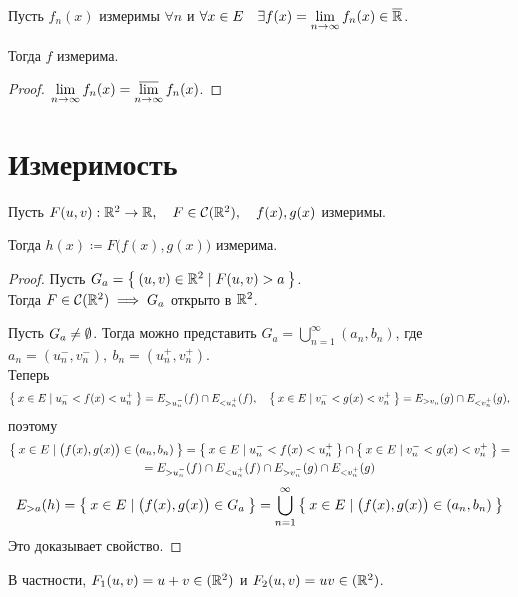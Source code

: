\begin{property}
	Пусть $ f_n(x) $ измеримы $ \forall n $ и $ \forall x \in E \quad \exists f(x) = \lim\limits_{n \to \infty} f_n(x) \in \overline {\mathbb{R}} $.

	Тогда $ f $ измерима.
\end{property}

\begin{proof}
	$ \lim\limits_{n \to \infty} f_n(x) = \varlimsup\limits_{n \to \infty} f_n(x) $.
\end{proof}

\section{Измеримость }

\begin{property}
	Пусть $ F(u, v) : \mathbb{R}^2 \to \mathbb{R}, \quad F \in \mathcal C(\mathbb{R}^2), \quad f(x), g(x) $ измеримы.

	Тогда $ h(x) \coloneq F \bigl( f(x), g(x) \bigr) $ измерима.
\end{property}

\begin{proof}

	Пусть $ G_a = \Set{(u, v) \in \ensuremath{\mathbb{R}}^2 \mid F(u, v) > a} $. \\
	Тогда $ F \in \mathcal C(\mathbb{R}^2) \implies G_a $ открыто в $ \mathbb{R}^2 $.

	Пусть $ G_a \ne \emptyset $. Тогда можно представить $ G_a = \bigcup_{n = 1}^\infty (a_n, b_n) $, где $ a_n = (u_n^-, v_n^-), ~ b_n = (u_n^+, v_n^+) $. \\
	Теперь
	$$ \Set{x \in E \mid u_n^- < f(x) < u_n^+} = E_{>u_n^-}(f) \cap E_{<u_n^+}(f), \quad \Set{x \in E \mid v_n^- < g(x) < v_n^+} = E_{>v_n}(g) \cap E_{<v_n^+}(g), $$
	поэтому
	\begin{multline*}
		\Set{x \in E \mid \bigl( f(x), g(x) \bigr) \in (a_n, b_n)} = \Set{x \in E \mid u_n^- < f(x) < u_n^+} \cap \Set{x \in E \mid v_n^- < g(x) < v_n^+} = \\
		= E_{>u_n^-}(f) \cap E_{<u_n^+}(f) \cap E_{>v_n^-}(g) \cap E_{<v_n^+}(g)
	\end{multline*}
	$$ E_{>a}(h) = \Set{x \in E \mid \bigl( f(x), g(x) \bigr) \in G_a} = \bigcup_{n = 1}^\infty \Set{x \in E \mid \bigl( f(x), g(x) \bigr) \in (a_n, b_n)} $$
	Это доказывает свойство.
\end{proof}

В частности, $ F_1(u, v) = u + v \in \mathcal(\mathbb{R}^2) $ и $ F_2(u, v) = uv \in \mathcal(\mathbb{R}^2) $.

